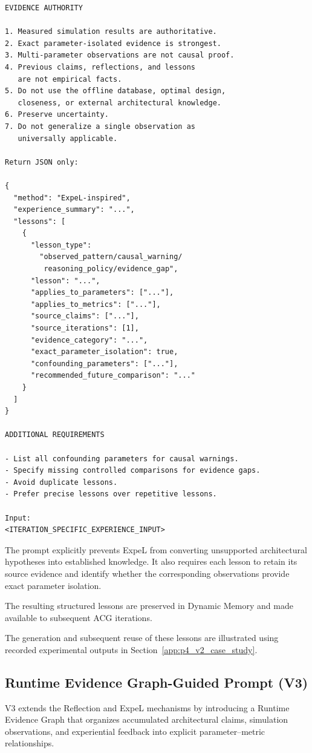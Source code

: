 \begin{lstlisting}
EVIDENCE AUTHORITY

1. Measured simulation results are authoritative.
2. Exact parameter-isolated evidence is strongest.
3. Multi-parameter observations are not causal proof.
4. Previous claims, reflections, and lessons
   are not empirical facts.
5. Do not use the offline database, optimal design,
   closeness, or external architectural knowledge.
6. Preserve uncertainty.
7. Do not generalize a single observation as
   universally applicable.

Return JSON only:

{
  "method": "ExpeL-inspired",
  "experience_summary": "...",
  "lessons": [
    {
      "lesson_type":
        "observed_pattern/causal_warning/
         reasoning_policy/evidence_gap",
      "lesson": "...",
      "applies_to_parameters": ["..."],
      "applies_to_metrics": ["..."],
      "source_claims": ["..."],
      "source_iterations": [1],
      "evidence_category": "...",
      "exact_parameter_isolation": true,
      "confounding_parameters": ["..."],
      "recommended_future_comparison": "..."
    }
  ]
}

ADDITIONAL REQUIREMENTS

- List all confounding parameters for causal warnings.
- Specify missing controlled comparisons for evidence gaps.
- Avoid duplicate lessons.
- Prefer precise lessons over repetitive lessons.

Input:
<ITERATION_SPECIFIC_EXPERIENCE_INPUT>
\end{lstlisting}

The prompt explicitly prevents ExpeL from
converting unsupported architectural hypotheses
into established knowledge. It also requires
each lesson to retain its source evidence and
identify whether the corresponding observations
provide exact parameter isolation.

The resulting structured lessons are preserved
in Dynamic Memory and made available to
subsequent ACG iterations.

The generation and subsequent reuse of these
lessons are illustrated using recorded
experimental outputs in
Section~\ref{app:p4_v2_case_study}.



\subsection{Runtime Evidence Graph-Guided Prompt (V3)}
\label{app:p4_graph_prompt}

V3 extends the Reflection and ExpeL mechanisms
by introducing a Runtime Evidence Graph that
organizes accumulated architectural claims,
simulation observations, and experiential
feedback into explicit parameter--metric
relationships.

